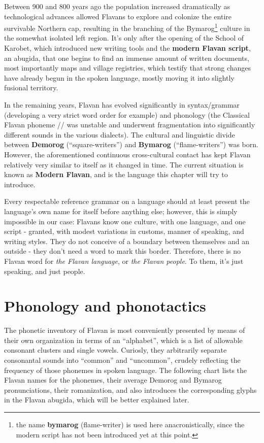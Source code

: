 \documentclass[10pt,oneside]{memoir}
\newcommand{\ipa}[1]{/\textipa{#1}/}
\begin{document}
Between 900 and 800 years ago the population increased dramatically as technological advances allowed Flavans to explore and colonize the entire survivable Northern cap, resulting in the branching of the Bymarog\footnote{the name \textbf{bymarog} (flame-writer) is used here anacronistically, since the modern script has not been introduced yet at this point.} culture in the somewhat isolated left region. It's only after the opening of the School of Karobet, which introduced new writing tools and the \textbf{modern Flavan script}, an abugida, that one begins to find an immense amount of written documents, most importantly maps and village registries, which testify that strong changes have already begun in the spoken language, mostly moving it into slightly fusional territory.

In the remaining years, Flavan has evolved significantly in syntax/grammar (developing a very strict word order for example) and phonology (the Classical Flavan phoneme \ipa{1} was unstable and underwent fragmentation into significantly different sounds in the various dialects). The cultural and linguistic divide between \textbf{Demorog} (``square-writers'') and \textbf{Bymarog} (``flame-writers'') was born. However, the aforementioned continuous cross-cultural contact has kept Flavan relatively very similar to itself as it changed in time. The current situation is known as \textbf{Modern Flavan}, and is the language this chapter will try to introduce.

Every respectable reference grammar on a language should at least present the language's own name for itself before anything else; however, this is simply impossible in our case: Flavans know one culture, with one language, and one script - granted, with modest variations in customs, manner of speaking, and writing styles. They do not conceive of a boundary between themselves and an outside - they don't need a word to mark this border. Therefore, there is no Flavan word for \emph{the Flavan language}, or \emph{the Flavan people}. To them, it's just speaking, and just people.

\pagebreak

\section{Phonology and phonotactics}

The phonetic inventory of Flavan is most conveniently presented by means of their own organization in terms of an ``alphabet'', which is a list of allowable consonant clusters and single vowels. Curiosly, they arbitrarily separate consonantal sounds into ``common'' and ``uncommon'', crudely reflecting the frequency of those phonemes in spoken language. The following chart lists the Flavan names for the phonemes, their average Demorog and Bymarog pronunciations, their romanization, and also introduces the corresponding glyphs in the Flavan abugida, which will be better explained later.
\end{document}
